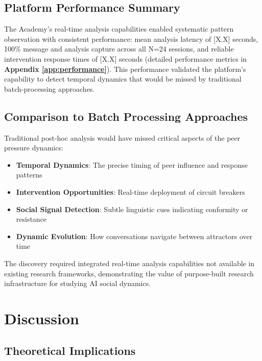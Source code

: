 \documentclass[11pt,letterpaper]{article}
\newcommand{\theacademy}{The Academy}
\newcommand{\exponedataTotalSessionsRaw}{24}
\newcommand{\exponedataTotalSessions}{N=\exponedataTotalSessionsRaw}
\newcommand{\platformLatency}{[X.X]}
\begin{document}
\subsection{Platform Performance Summary}

\theacademy{}'s real-time analysis capabilities enabled systematic pattern observation with consistent performance: mean analysis latency of \platformLatency{} seconds, 100\% message and analysis capture across all \exponedataTotalSessions{} sessions, and reliable intervention response times of \platformLatency{} seconds (detailed performance metrics in \textbf{Appendix \ref{app:performance}}). This performance validated the platform's capability to detect temporal dynamics that would be missed by traditional batch-processing approaches.

\subsection{Comparison to Batch Processing Approaches}

Traditional post-hoc analysis would have missed critical aspects of the peer pressure dynamics:

\begin{itemize}
    \item \textbf{Temporal Dynamics}: The precise timing of peer influence and response patterns
    \item \textbf{Intervention Opportunities}: Real-time deployment of circuit breakers
    \item \textbf{Social Signal Detection}: Subtle linguistic cues indicating conformity or resistance
    \item \textbf{Dynamic Evolution}: How conversations navigate between attractors over time
\end{itemize}

The discovery required integrated real-time analysis capabilities not available in existing research frameworks, demonstrating the value of purpose-built research infrastructure for studying AI social dynamics.

\section{Discussion}

\subsection{Theoretical Implications}
\end{document}
